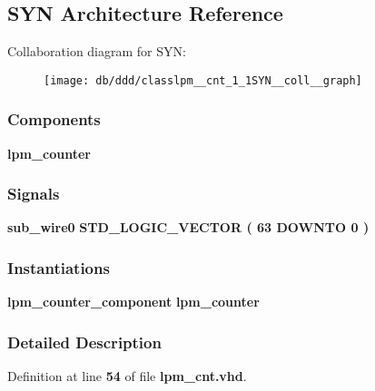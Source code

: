 \subsection{S\+YN Architecture Reference}
\label{classlpm__cnt_1_1SYN}


Collaboration diagram for S\+YN\+:\nopagebreak
\begin{figure}[H]
\begin{center}
\leavevmode
\texttt{[image: db/ddd/classlpm\_\_cnt\_1\_1SYN\_\_coll\_\_graph]}
\end{center}
\end{figure}
\subsubsection*{Components}
 \begin{DoxyCompactItemize}
\item 
{\bf lpm\+\_\+counter}  {\bfseries }  
\end{DoxyCompactItemize}
\subsubsection*{Signals}
 \begin{DoxyCompactItemize}
\item 
{\bf sub\+\_\+wire0} {\bfseries \textcolor{comment}{S\+T\+D\+\_\+\+L\+O\+G\+I\+C\+\_\+\+V\+E\+C\+T\+OR}\textcolor{vhdlchar}{ }\textcolor{vhdlchar}{(}\textcolor{vhdlchar}{ }\textcolor{vhdlchar}{ } \textcolor{vhdldigit}{63} \textcolor{vhdlchar}{ }\textcolor{keywordflow}{D\+O\+W\+N\+TO}\textcolor{vhdlchar}{ }\textcolor{vhdlchar}{ } \textcolor{vhdldigit}{0} \textcolor{vhdlchar}{ }\textcolor{vhdlchar}{)}\textcolor{vhdlchar}{ }} 
\end{DoxyCompactItemize}
\subsubsection*{Instantiations}
 \begin{DoxyCompactItemize}
\item 
{\bf lpm\+\_\+counter\+\_\+component}  {\bfseries lpm\+\_\+counter}   
\end{DoxyCompactItemize}


\subsubsection{Detailed Description}


Definition at line {\bf 54} of file {\bf lpm\+\_\+cnt.\+vhd}.



